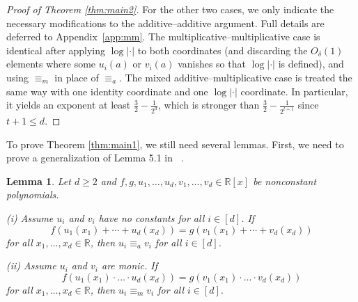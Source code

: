 \documentclass[12pt,reqno]{amsart}
\numberwithin{equation}{section}
\newtheorem{lemma}[theorem]{Lemma}
\begin{document}
\begin{proof}[Proof of Theorem \ref{thm:main2}]
\smallskip
\noindent For the other two cases, we only indicate the necessary modifications to the additive--additive argument. Full details are deferred to Appendix~\ref{app:mm}.
 The multiplicative--multiplicative case is identical after applying $\log|\cdot|$ to both coordinates (and discarding the $O_\delta(1)$ elements where some $u_i(a)$ or $v_i(a)$ vanishes so that $\log|\cdot|$ is defined), and using $\equiv_m$ in place of $\equiv_a$. The mixed additive--multiplicative case is treated the same way with one identity coordinate and one $\log|\cdot|$ coordinate. In particular, it yields an exponent at least $\frac32-\frac1{2^{d}}$, which is stronger than $\frac32-\frac1{2^{t+1}}$ since $t+1\le d$.
\end{proof}















To prove Theorem \ref{thm:main1}, we still need several lemmas. First, we need to prove a generalization of Lemma 5.1 in ~\cite{jing2022semialgebraic}.


\begin{lemma}\label{lem:poly}
Let $d\geq 2$ and $f,g,u_{1},\ldots,u_{d},v_{1},\ldots,v_{d}\in \mathbb{R}[x]$ be nonconstant polynomials.

(i)  Assume $u_{i}$ and $v_{i}$ have no constants for all $i\in[d]$. If
$$f(u_{1}(x_{1})+\cdots+u_{d}(x_{d}))=g(v_{1}(x_{1})+\cdots+v_{d}(x_{d}))$$
for all $x_{1},\ldots,x_{d}\in\mathbb{R}$, then $u_{i}\equiv_{a} v_{i}$ for all $i\in[d]$.

(ii) Assume $u_{i}$ and $v_{i}$ are monic. If
$$f(u_{1}(x_{1})\cdot\ldots\cdot u_{d}(x_{d}))=g(v_{1}(x_{1}) \cdot\ldots\cdot v_{d}(x_{d}))$$
for all $x_{1},\ldots,x_{d}\in\mathbb{R}$, then $u_{i}\equiv_{m} v_{i}$ for all $i\in[d].$
\end{lemma}
\end{document}
